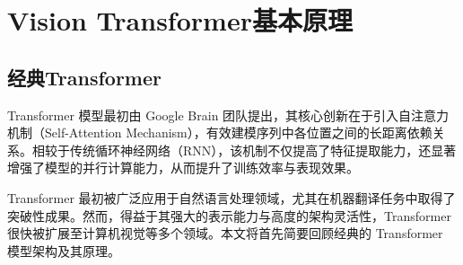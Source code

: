 \section{Vision Transformer基本原理}
\subsection{经典Transformer}
Transformer 模型最初由 Google Brain 团队提出，其核心创新在于引入自注意力机制（Self-Attention Mechanism），有效建模序列中各位置之间的长距离依赖关系。相较于传统循环神经网络（RNN），该机制不仅提高了特征提取能力，还显著增强了模型的并行计算能力，从而提升了训练效率与表现效果。

Transformer 最初被广泛应用于自然语言处理领域，尤其在机器翻译任务中取得了突破性成果。然而，得益于其强大的表示能力与高度的架构灵活性，Transformer 很快被扩展至计算机视觉等多个领域。本文将首先简要回顾经典的 Transformer 模型架构及其原理\supercite{vaswaniAttentionAllYou2017}。

